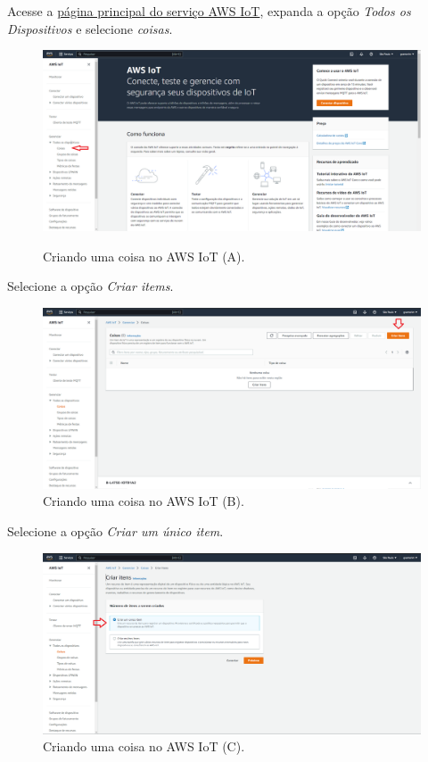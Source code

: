 Acesse a \href{https://us-east-1.console.aws.amazon.com/iot/home?region=us-east-1#/home}{página principal do serviço AWS IoT}, expanda a opção \textit{Todos os Dispositivos} e selecione \textit{coisas}.

\begin{figure}[H]
    \centering
    \caption{Criando uma coisa no AWS IoT (A).}
    \includegraphics[scale=0.315]{Imagens/criando_uma_coisa_no_aws_iot_0.png}
    \label{fig:criacao_de_uma_coisa_no_aws_iot_a}
\end{figure}

Selecione a opção \textit{Criar items}.

\begin{figure}[H]
    \centering
    \caption{Criando uma coisa no AWS IoT (B).}
    \includegraphics[scale=0.315]{Imagens/criando_uma_coisa_no_aws_iot_1.png}
\end{figure}

Selecione a opção \textit{Criar um único item}.

\begin{figure}[H]
    \centering
    \caption{Criando uma coisa no AWS IoT (C).}
    \includegraphics[scale=0.315]{Imagens/criando_uma_coisa_no_aws_iot_2.png}
\end{figure}

